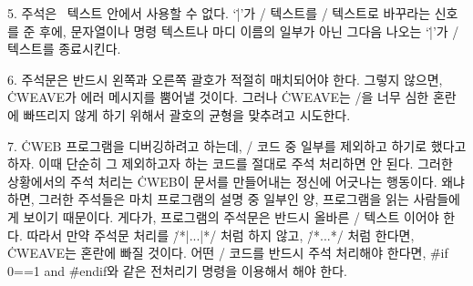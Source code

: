 5. 주석은 \pb\ 텍스트 안에서 사용할 수 없다. `\.|'가 \TEX/
텍스트를 \CEE/ 텍스트로 바꾸라는 신호를 준 후에, 
문자열이나 명령 텍스트나 마디 이름의 일부가 아닌 그다음 나오는
`\.|'가 \CEE/ 텍스트를 종료시킨다.

6. 주석문은 반드시 왼쪽과 오른쪽 괄호가 적절히 매치되어야 한다. 그렇지
않으면, \.{CWEAVE}가 에러 메시지를 뿜어낼 것이다. 그러나 \.{CWEAVE}는
\TEX/을 너무 심한 혼란에 빠뜨리지 않게 하기 위해서 괄호의 균형을
맞추려고 시도한다.

7. \.{CWEB} 프로그램을 디버깅하려고 하는데, \CEE/ 코드 중 일부를
제외하고 하기로 했다고 하자. 이때 단순히 그 제외하고자 하는 코드를
절대로 주석 처리하면 안 된다. 그러한 상황에서의 주석 처리는 \.{CWEB}이
문서를 만들어내는 정신에 어긋나는 행동이다. 왜냐하면, 그러한 주석들은
마치 프로그램의 설명 중 일부인 양, 프로그램을 읽는 사람들에게 보이기
때문이다. 게다가, 프로그램의 주석문은 반드시 올바른 \TEX/ 텍스트
이어야 한다. 따라서 만약 주석문 처리를 \.{/*|...|*/} 처럼 하지
않고, \.{/*...*/} 처럼 한다면, \.{CWEAVE}는 혼란에 빠질
것이다. 어떤 \CEE/ 코드를 반드시 주석 처리해야 한다면, \.{\#if 0==1}
and \.{\#endif}와 같은 전처리기 명령을 이용해서 해야 한다.

